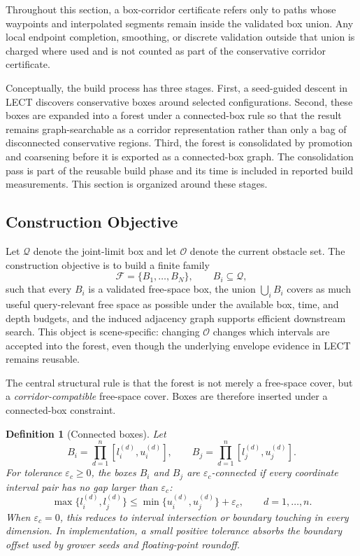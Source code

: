 \documentclass[journal]{IEEEtran}
\newtheorem{definition}{Definition}
\newcommand{\calO}{\ensuremath{\mathcal{O}}}
\newcommand{\Q}{\ensuremath{\mathcal{Q}}}
\begin{document}
Throughout this section, a box-corridor certificate refers only to paths whose
waypoints and interpolated segments remain inside the validated box union. Any
local endpoint completion, smoothing, or discrete validation outside that union
is charged where used and is not counted as part of the conservative corridor
certificate.

Conceptually, the build process has three stages. First, a seed-guided descent
in LECT discovers conservative boxes around selected configurations. Second,
these boxes are expanded into a forest under a connected-box rule so that the
result remains graph-searchable as a corridor representation rather than only a
bag of disconnected conservative regions. Third, the forest is consolidated by
promotion and coarsening before it is exported as a connected-box graph. The
consolidation pass is part of the reusable build phase and its time is included
in reported build measurements. This section is organized around these stages.

\subsection{Construction Objective}\label{sec:forest_objective}

Let $\Q$ denote the joint-limit box and let $\calO$ denote the current obstacle
set. The construction objective is to build a finite family
\[
\mathcal{F} = \{B_1,\dots,B_N\}, \qquad B_i \subseteq \Q,
\]
such that every $B_i$ is a validated free-space box, the union
$\bigcup_i B_i$ covers as much useful query-relevant free space as possible
under the available box, time, and depth budgets, and the induced adjacency
graph supports efficient downstream search. This object is scene-specific:
changing $\calO$ changes which intervals are accepted into the forest, even
though the underlying envelope evidence in LECT remains reusable.

The central structural rule is that the forest is not merely a free-space cover,
but a \emph{corridor-compatible} free-space cover. Boxes are therefore inserted
under a connected-box constraint.

\begin{definition}[Connected boxes]\label{def:connected_boxes}
Let
\[
B_i = \prod_{d=1}^{n}[l_i^{(d)},u_i^{(d)}],
\qquad
B_j = \prod_{d=1}^{n}[l_j^{(d)},u_j^{(d)}].
\]
For tolerance $\varepsilon_c \ge 0$, the boxes $B_i$ and $B_j$ are
$\varepsilon_c$-connected if every coordinate interval pair has no gap larger
than $\varepsilon_c$:
\[
\max\{l_i^{(d)},l_j^{(d)}\}
\le
\min\{u_i^{(d)},u_j^{(d)}\}+\varepsilon_c,
\qquad d=1,\ldots,n.
\]
When $\varepsilon_c=0$, this reduces to interval intersection or boundary
touching in every dimension. In implementation, a small positive tolerance
absorbs the boundary offset used by grower seeds and floating-point roundoff.
\end{definition}
\end{document}
